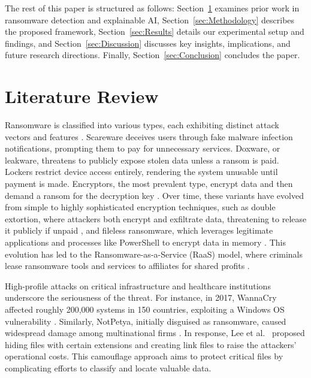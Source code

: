 The rest of this paper is structured as follows: Section~\ref{sec:related_work}  examines prior work in ransomware detection and explainable AI, Section~\ref{sec:Methodology}  describes the proposed framework, Section~\ref{sec:Results}  details our experimental setup and findings, and Section~\ref{sec:Discussion} discusses key insights, implications, and future research directions. Finally, Section~\ref{sec:Conclusion} concludes the paper.


\section{Literature Review}
\label{sec:related_work}

Ransomware is classified into various types, each exhibiting distinct attack vectors and features \cite{beaman2021ransomware, razaulla2023age}. 
Scareware deceives users through fake malware infection notifications, prompting them to pay for unnecessary services. Doxware, or leakware, threatens to  publicly expose stolen data unless a ransom is paid. Lockers restrict device access entirely, rendering the system unusable until payment is made. Encryptors, the most prevalent type, encrypt data and then demand a ransom for the decryption key \cite{beaman2021ransomware}. Over time, these variants have evolved from simple  to highly sophisticated encryption techniques, such as double extortion, where attackers  both encrypt and exfiltrate data, threatening to release it publicly if unpaid \cite{europol2020iocta}, and fileless ransomware, which leverages legitimate applications and processes like PowerShell to encrypt data in memory \cite{krishna2020comparative}. This evolution has led to the Ransomware-as-a-Service (RaaS) model, where  criminals lease ransomware tools and services to  affiliates for shared profits \cite{meland2020ransomware}.

High-profile attacks on critical infrastructure and healthcare institutions underscore the seriousness of the threat. For instance, in 2017, WannaCry affected  roughly 200,000 systems in 150 countries, exploiting a Windows OS vulnerability \cite{huang2018systematically}. Similarly, NotPetya, initially disguised as ransomware, caused widespread damage among multinational firms \cite{greenberg2018untold}. In response, Lee et al.~\cite{lee2023hiding} proposed hiding files with certain extensions and creating link files  to raise the attackers’ operational costs. This camouflage approach aims to protect critical files by complicating efforts to classify and locate valuable data.

